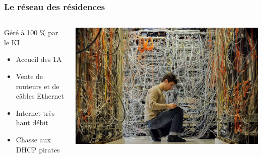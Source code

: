 \documentclass[14pt]{beamer}
\title{}
\date{\today}
\author{KI'018}
\begin{document}
\begin{frame}
    \titlepage
\end{frame}




\begin{frame}
    \frametitle{Le réseau des résidences}
    \begin{columns}
        \begin{column}{.6\textwidth}
            Géré à 100 \% par le KI
            \begin{itemize}
                \item Accueil des 1A
                \item Vente de routeurs et de câbles Ethernet
                \item Internet très haut débit
                \item Chasse aux DHCP pirates
            \end{itemize}
        \end{column}
        \begin{column}{.4\textwidth}
        \includegraphics[width=\textwidth]{reseau.jpg}
        \end{column}
    \end{columns}
\end{frame}
\end{document}
